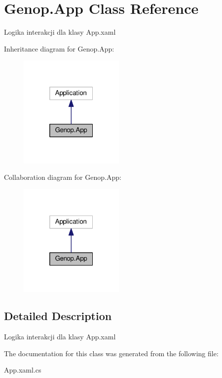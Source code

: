 \hypertarget{classGenop_1_1App}{}\section{Genop.\+App Class Reference}
\label{classGenop_1_1App}


Logika interakcji dla klasy App.\+xaml  




Inheritance diagram for Genop.\+App\+:
\nopagebreak
\begin{figure}[H]
\begin{center}
\leavevmode
\includegraphics[width=145pt]{classGenop_1_1App__inherit__graph}
\end{center}
\end{figure}


Collaboration diagram for Genop.\+App\+:
\nopagebreak
\begin{figure}[H]
\begin{center}
\leavevmode
\includegraphics[width=145pt]{classGenop_1_1App__coll__graph}
\end{center}
\end{figure}


\subsection{Detailed Description}
Logika interakcji dla klasy App.\+xaml 



The documentation for this class was generated from the following file\+:\begin{DoxyCompactItemize}
\item 
App.\+xaml.\+cs\end{DoxyCompactItemize}
